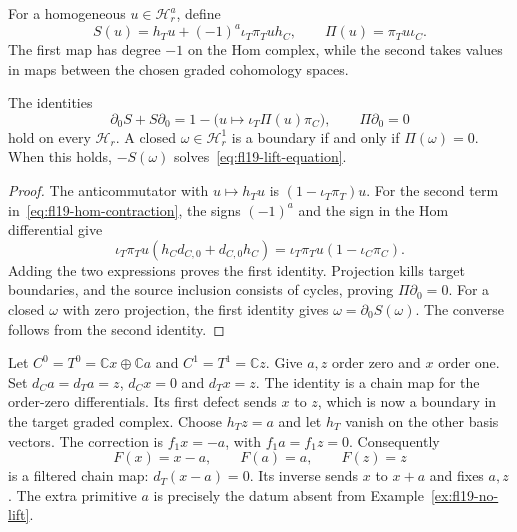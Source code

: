 For a homogeneous $u\in\mathcal H_r^a$, define
\begin{equation}\label{eq:fl19-hom-contraction}
S(u)=h_Tu+(-1)^a\iota_T\pi_Tu h_C,
\qquad \Pi(u)=\pi_Tu\iota_C.
\end{equation}
The first map has degree $-1$ on the Hom complex, while the second takes values in maps between the chosen graded cohomology spaces.

\begin{lemma}\label{lem:fl19-hom-primitive}
The identities
\[
\partial_0 S+S\partial_0=1-\bigl(u\mapsto\iota_T\Pi(u)\pi_C\bigr),
\qquad \Pi\partial_0=0
\]
hold on every $\mathcal H_r$.
A closed $\omega\in\mathcal H_r^1$ is a boundary if and only if $\Pi(\omega)=0$.
When this holds, $-S(\omega)$ solves~\eqref{eq:fl19-lift-equation}.
\end{lemma}
\begin{proof}
The anticommutator with $u\mapsto h_Tu$ is $(1-\iota_T\pi_T)u$.
For the second term in~\eqref{eq:fl19-hom-contraction}, the signs $(-1)^a$ and the sign in the Hom differential give
\[
\iota_T\pi_Tu(h_Cd_{C,0}+d_{C,0}h_C)
=\iota_T\pi_Tu(1-\iota_C\pi_C).
\]
Adding the two expressions proves the first identity.
Projection kills target boundaries, and the source inclusion consists of cycles, proving $\Pi\partial_0=0$.
For a closed $\omega$ with zero projection, the first identity gives $\omega=\partial_0S(\omega)$.
The converse follows from the second identity.
\end{proof}

\begin{example}\label{ex:fl19-successful-lift}
Let $C^0=T^0=\mathbb Cx\oplus\mathbb Ca$ and $C^1=T^1=\mathbb Cz$.
Give $a,z$ order zero and $x$ order one.
Set $d_Ca=d_Ta=z$, $d_Cx=0$ and $d_Tx=z$.
The identity is a chain map for the order-zero differentials.
Its first defect sends $x$ to $z$, which is now a boundary in the target graded complex.
Choose $h_Tz=a$ and let $h_T$ vanish on the other basis vectors.
The correction is $f_1x=-a$, with $f_1a=f_1z=0$.
Consequently
\[
F(x)=x-a,\qquad F(a)=a,\qquad F(z)=z
\]
is a filtered chain map: $d_T(x-a)=0$.
Its inverse sends $x$ to $x+a$ and fixes $a,z$.
The extra primitive $a$ is precisely the datum absent from Example~\ref{ex:fl19-no-lift}.
\end{example}

